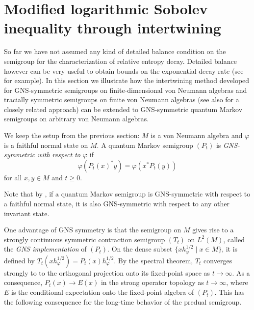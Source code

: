 \documentclass[12pt,a4paper]{amsart}
\newcommand{\1}{\mathds{1}}
\renewcommand{\phi}{\varphi}
\renewcommand{\AA}{\mathfrak A}
\newcommand{\E}{\mathcal E}
\theoremstyle{plain}
\theoremstyle{definition}
\theoremstyle{remark}
\begin{document}

\section{Modified logarithmic Sobolev inequality through intertwining}\label{sec:MLSI_intertwining}

So far we have not assumed any kind of detailed balance condition on the semigroup for the characterization of relative entropy decay. Detailed balance however can be very useful to obtain bounds on the exponential decay rate (see \cite{KT13,CM15} for example). In this section we illustrate how the intertwining method developed for GNS-symmetric semigroups on finite-dimensional von Neumann algebras \cite{CM17,CM20,MWZ24} and tracially symmetric semigroups on finite von Neumann algebras \cite{WZ21} (see also \cite{BGJ22,LJL24} for a closely related approach) can be extended to GNS-symmetric quantum Markov semigroups on arbitrary von Neumann algebras. 

We keep the setup from the previous section: $M$ is a von Neumann algebra and $\phi$ is a faithful normal state on $M$. A quantum Markov semigroup $(P_t)$ is \emph{GNS-symmetric with respect to $\phi$} if 
\begin{equation*}
    \phi(P_t(x)^\ast y)=\phi(x^\ast P_t(y))
\end{equation*}
for all $x,y\in M$ and $t\geq 0$.

Note that by \cite[Lemma 4.16]{GJLL25}, if a quantum Markov semigroup is GNS-symmetric with respect to a faithful normal state, it is also GNS-symmetric with respect to any other invariant state.

One advantage of GNS symmetry is that the semigroup on $M$ gives rise to a strongly continuous symmetric contraction semigroup $(T_t)$ on $L^2(M)$, called the \emph{GNS implementation} of $(P_t)$. On the dense subset $\{xh_\phi^{1/2}\mid x\in M\}$, it is defined by $T_t(xh_\phi^{1/2})=P_t(x) h_\phi^{1/2}$. By the spectral theorem, $T_t$ converges strongly to to the orthogonal projection onto its fixed-point space as $t\to\infty$. As a consequence, $P_t(x)\to E(x)$ in the strong operator topology as $t\to\infty$, where $E$ is the conditional expectation onto the fixed-point algebra of $(P_t)$. This has the following consequence for the long-time behavior of the predual semigroup.
\end{document}

